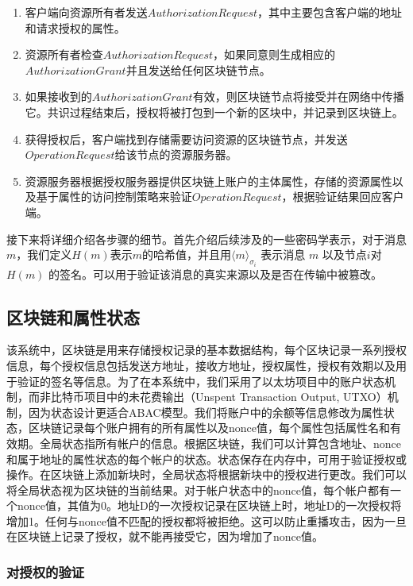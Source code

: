 \begin{enumerate}
  \item 客户端向资源所有者发送$Authorization Request$，其中主要包含客户端的地址和请求授权的属性。
  \item 资源所有者检查$Authorization Request$，如果同意则生成相应的$Authorization Grant$并且发送给任何区块链节点。
  \item 如果接收到的$Authorization Grant$有效，则区块链节点将接受并在网络中传播它。共识过程结束后，授权将被打包到一个新的区块中，并记录到区块链上。
  \item 获得授权后，客户端找到存储需要访问资源的区块链节点，并发送$Operation Request$给该节点的资源服务器。
  \item 资源服务器根据授权服务器提供区块链上账户的主体属性，存储的资源属性以及基于属性的访问控制策略来验证$Operation Request$，根据验证结果回应客户端。
\end{enumerate}

接下来将详细介绍各步骤的细节。首先介绍后续涉及的一些密码学表示，对于消息$m$，我们定义$H(m)$表示$m$的哈希值，并且用$\langle m \rangle_{\sigma_{i}}$ 表示消息 $m$ 以及节点$i$对 $H(m)$ 的签名。可以用于验证该消息的真实来源以及是否在传输中被篡改。

\subsection{区块链和属性状态}

该系统中，区块链是用来存储授权记录的基本数据结构，每个区块记录一系列授权信息，每个授权信息包括发送方地址，接收方地址，授权属性，授权有效期以及用于验证的签名等信息。为了在本系统中，我们采用了以太坊项目中的账户状态机制，而非比特币项目中的未花费输出（Unspent Transaction Output, UTXO）机制，因为状态设计更适合ABAC模型。我们将账户中的余额等信息修改为属性状态，区块链记录每个账户拥有的所有属性以及nonce值，每个属性包括属性名和有效期。全局状态指所有帐户的信息。根据区块链，我们可以计算包含地址、nonce和属于地址的属性状态的每个帐户的状态。状态保存在内存中，可用于验证授权或操作。在区块链上添加新块时，全局状态将根据新块中的授权进行更改。我们可以将全局状态视为区块链的当前结果。对于帐户状态中的nonce值，每个帐户都有一个nonce值，其值为0。地址D的一次授权记录在区块链上时，地址D的一次授权将增加1。任何与nonce值不匹配的授权都将被拒绝。这可以防止重播攻击，因为一旦在区块链上记录了授权，就不能再接受它，因为增加了nonce值。

\subsubsection{对授权的验证}


